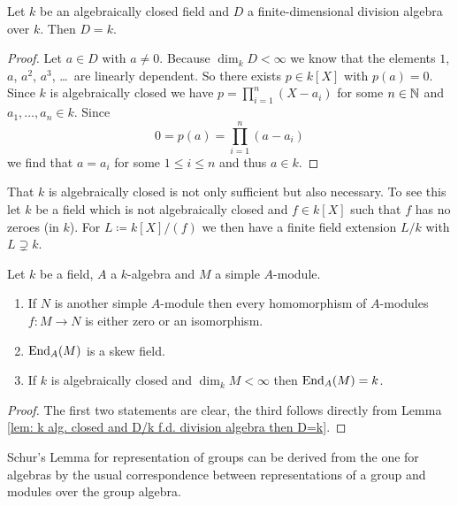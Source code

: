 \begin{lem}\label{lem: k alg. closed and D/k f.d. division algebra then D=k}
 Let $k$ be an algebraically closed field and $D$ a finite-dimensional division algebra over $k$. Then $D = k$.
\end{lem}
\begin{proof}
 Let $a \in D$ with $a \neq 0$. Because $\dim_k D < \infty$ we know that the elements $1$, $a$, $a^2$, $a^3$, \dots\ are linearly dependent. So there exists $p \in k[X]$ with $p(a) = 0$. Since $k$ is algebraically closed we have $p = \prod_{i=1}^n (X-a_i)$ for some $n \in \mathbb{N}$ and $a_1, \dotsc, a_n \in k$. Since
 \[
  0 = p(a) = \prod_{i=1}^n (a-a_i)
 \]
 we find that $a = a_i$ for some $1 \leq i \leq n$ and thus $a \in k$.
\end{proof}


\begin{rem}
 That $k$ is algebraically closed is not only sufficient but also necessary. To see this let $k$ be a field which is not algebraically closed and $f \in k[X]$ such that $f$ has no zeroes (in $k$). For $L \coloneqq k[X]/(f)$ we then have a finite field extension $L/k$ with $L \supsetneq k$.
\end{rem}


\begin{lem}
 Let $k$ be a field, $A$ a $k$-algebra and $M$ a simple $A$-module.
 \begin{enumerate}[label=\emph{\alph*})]
  \item
   If $N$ is another simple $A$-module then every homomorphism of $A$-modules $f \colon M \to N$ is either zero or an isomorphism.
  \item
   $\operatorname{End}_A(M)$ is a skew field.
  \item
   If $k$ is algebraically closed and $\dim_k M < \infty$ then $\operatorname{End}_A(M) = k$.
 \end{enumerate}
\end{lem}
\begin{proof}
 The first two statements are clear, the third follows directly from Lemma \ref{lem: k alg. closed and D/k f.d. division algebra then D=k}.
\end{proof}


\begin{rem}
 Schur’s Lemma for representation of groups can be derived from the one for algebras by the usual correspondence between representations of a group and modules over the group algebra.
\end{rem}


